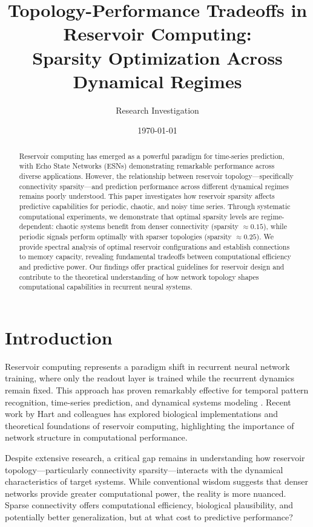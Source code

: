 \documentclass[11pt,a4paper]{article}
\title{\textbf{Topology-Performance Tradeoffs in Reservoir Computing:\\ Sparsity Optimization Across Dynamical Regimes}}
\author{Research Investigation}
\date{\today}
\begin{document}
\maketitle

\begin{abstract}
Reservoir computing has emerged as a powerful paradigm for time-series prediction, with Echo State Networks (ESNs) demonstrating remarkable performance across diverse applications. However, the relationship between reservoir topology—specifically connectivity sparsity—and prediction performance across different dynamical regimes remains poorly understood. This paper investigates how reservoir sparsity affects predictive capabilities for periodic, chaotic, and noisy time series. Through systematic computational experiments, we demonstrate that optimal sparsity levels are regime-dependent: chaotic systems benefit from denser connectivity (sparsity $\approx 0.15$), while periodic signals perform optimally with sparser topologies (sparsity $\approx 0.25$). We provide spectral analysis of optimal reservoir configurations and establish connections to memory capacity, revealing fundamental tradeoffs between computational efficiency and predictive power. Our findings offer practical guidelines for reservoir design and contribute to the theoretical understanding of how network topology shapes computational capabilities in recurrent neural systems.
\end{abstract}

\section{Introduction}

Reservoir computing \citep{jaeger2001echo, maass2002real} represents a paradigm shift in recurrent neural network training, where only the readout layer is trained while the recurrent dynamics remain fixed. This approach has proven remarkably effective for temporal pattern recognition, time-series prediction, and dynamical systems modeling \citep{lukosevicius2009reservoir}. Recent work by Hart and colleagues \citep{hart2021thesis, hart2022brain, hart2025hippocampal} has explored biological implementations and theoretical foundations of reservoir computing, highlighting the importance of network structure in computational performance.

Despite extensive research, a critical gap remains in understanding how reservoir topology—particularly connectivity sparsity—interacts with the dynamical characteristics of target systems. While conventional wisdom suggests that denser networks provide greater computational power, the reality is more nuanced. Sparse connectivity offers computational efficiency, biological plausibility, and potentially better generalization, but at what cost to predictive performance?
\end{document}
